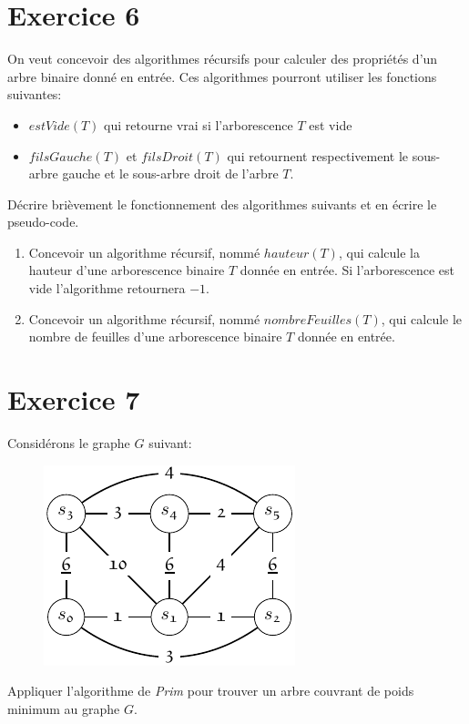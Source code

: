 \documentclass{article}[12pt]
\begin{document}
\section*{Exercice 6}

On veut concevoir des algorithmes récursifs pour calculer des propriétés d'un arbre binaire donné en entrée. 
Ces algorithmes pourront utiliser les fonctions suivantes: 
\begin{itemize}
    \item $estVide(T)$ qui retourne vrai si l'arborescence $T$ est vide
    \item $filsGauche(T)$ et $filsDroit(T)$ qui retournent respectivement le sous-arbre gauche et le sous-arbre droit de l'arbre $T$.
\end{itemize}

 Décrire brièvement le fonctionnement des algorithmes suivants et en écrire le pseudo-code.
\begin{enumerate}			
\item Concevoir un algorithme récursif, nommé $hauteur(T)$, qui calcule la hauteur d'une arborescence binaire $T$ donnée en entrée. Si l'arborescence est vide l'algorithme retournera $-1$.

\item Concevoir un algorithme récursif, nommé $nombreFeuilles(T)$, qui calcule le nombre de feuilles d'une arborescence binaire $T$ donnée en entrée. 
\end{enumerate}	
	
	
\section*{Exercice 7}

Considérons le graphe $G$ suivant:\\

\begin{figure}[h!]
    \centering
    \includegraphics{Kruskal-1.png}
    \label{fig:my_label}
\end{figure}

Appliquer l'algorithme de \textit{Prim} pour trouver un arbre couvrant de poids minimum au graphe $G$.
\end{document}
